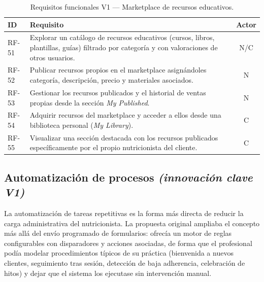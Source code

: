 \begin{table}[tbp]
\centering
\small
\begin{tabular}{|l|p{10.5cm}|c|}
\hline
\textbf{ID} & \textbf{Requisito} & \textbf{Actor} \\
\hline
RF-51 & Explorar un catálogo de recursos educativos (cursos, libros, plantillas, guías) filtrado por categoría y con valoraciones de otros usuarios. & N/C \\
\hline
RF-52 & Publicar recursos propios en el marketplace asignándoles categoría, descripción, precio y materiales asociados. & N \\
\hline
RF-53 & Gestionar los recursos publicados y el historial de ventas propias desde la sección \textit{My Published}. & N \\
\hline
RF-54 & Adquirir recursos del marketplace y acceder a ellos desde una biblioteca personal (\textit{My Library}). & C \\
\hline
RF-55 & Visualizar una sección destacada con los recursos publicados específicamente por el propio nutricionista del cliente. & C \\
\hline
\end{tabular}
\caption{Requisitos funcionales V1 --- Marketplace de recursos educativos.}
\label{tab:rf-marketplace-v1}
\end{table}

\subsection{Automatización de procesos \textnormal{\textit{(innovación clave V1)}}}

La automatización de tareas repetitivas es la forma más directa de reducir la carga administrativa del nutricionista. La propuesta original ampliaba el concepto más allá del envío programado de formularios: ofrecía un motor de reglas configurables con disparadores y acciones asociadas, de forma que el profesional podía modelar procedimientos típicos de su práctica (bienvenida a nuevos clientes, seguimiento tras sesión, detección de baja adherencia, celebración de hitos) y dejar que el sistema los ejecutase sin intervención manual.

